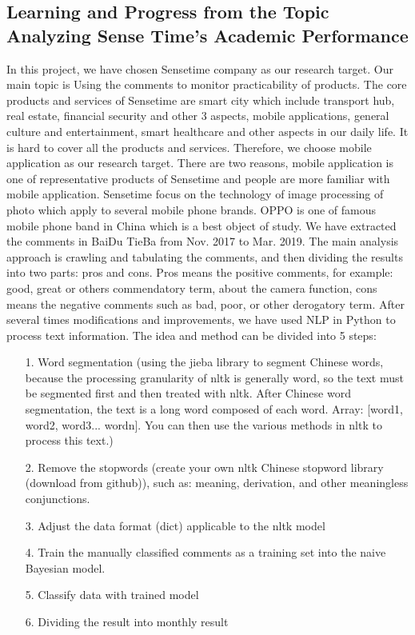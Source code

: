 \documentclass{article}
\begin{document}
\subsection{Learning and Progress from the Topic Analyzing Sense Time’s Academic Performance}
In this project, we have chosen Sensetime company as our research target. Our main topic is Using the comments to monitor practicability of products. The core products and services of Sensetime are smart city which include transport hub, real estate, financial security and other 3 aspects, mobile applications, general culture and entertainment, smart healthcare and other aspects in our daily life.  It is hard to cover all the products and services. Therefore, we choose mobile application as our research target. There are two reasons, mobile application is one of representative products of Sensetime and people are more familiar with mobile application. Sensetime focus on the technology of image processing of photo which apply to several mobile phone brands. OPPO is one of famous mobile phone band in China which is a best object of study. 
We have extracted the comments in BaiDu TieBa from Nov. 2017 to Mar. 2019. The main analysis approach is crawling and tabulating the comments, and then dividing the results into two parts: pros and cons. Pros means the positive comments, for example: good, great or others commendatory term, about the camera function, cons means the negative comments such as bad, poor, or other derogatory term. After several times modifications and improvements, we have used NLP in Python to process text information. The idea and method can be divided into 5 steps:
\begin{itemize}
    \item[1.] Word segmentation (using the jieba library to segment Chinese words, because the processing granularity of nltk is generally word, so the text must be segmented first and then treated with nltk. After Chinese word segmentation, the text is a long word composed of each word. Array: [word1, word2, word3... wordn]. You can then use the various methods in nltk to process this text.) 
    \item[2.]Remove the stopwords (create your own nltk Chinese stopword library (download from github)), such as: meaning, derivation, and other meaningless conjunctions.
    \item[3.]Adjust the data format (dict) applicable to the nltk model
    \item[4.]Train the manually classified comments as a training set into the naive Bayesian model.
    \item[5.]Classify data with trained model
    \item[6.]Dividing the result into monthly result 
\end{itemize}
\end{document}
